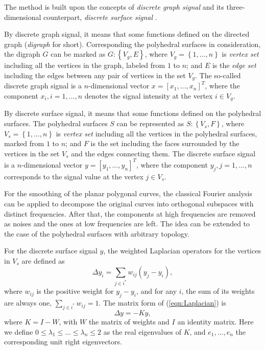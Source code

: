 The method is built upon the concepts of \emph{discrete graph signal} and its three-dimensional counterpart, \emph{discrete surface signal} \cite{Taubin1995SIG}.

By discrete graph signal, it means that some functions defined on the directed graph (\emph{digraph} for short).
Corresponding the polyhedral surfaces in consideration, the digraph $G$ can be marked as $G: \left\{ V_g, E\right\}$, where $V_g = \left\{ 1, \ldots, n \right\}$ is \emph{vertex set} including all the vertices in the graph, labeled from $1$ to $n$; and $E$ is the \emph{edge set} including the edges between any pair of vertices in the set $V_g$. %
The so-called discrete graph signal is a $n$-dimensional vector $x = \left[ x_1, \ldots, x_n \right]^T$, where the component $x_i, i = 1, \ldots, n$ denotes the signal intensity at the vertex $i \in V_g$. %

By discrete surface signal, it means that some functions defined on the polyhedral surfaces.
The polyhedral surfaces $S$ can be represented as $S: \left\{ V_s, F\right\}$, where $V_s = \left\{ 1, \ldots, n \right\}$ is \emph{vertex set} including all the vertices in the polyhedral surfaces, marked from $1$ to $n$; and $F$ is the set including the faces surrounded by the vertices in the set $V_s$ and the edges connecting them. %
The discrete surface signal is a $n$-dimensional vector $y = \left[ y_1, \ldots, y_n \right]^T$, where the component $y_j, j = 1, \ldots, n$ corresponds to the signal value at the vertex $j \in V_s$. %

For the smoothing of the planar polygonal curves, the classical Fourier analysis can be applied to decompose the original curves into orthogonal subspaces with distinct frequencies. %
After that, the components at high frequencies are removed as noises and the ones at low frequencies are left.
The idea can be extended to the case of the polyhedral surfaces with arbitrary topology.

For the discrete surface signal $y$, the weighted Laplacian operators for the vertices in $V_s$ are defined as
\begin{equation}
\label{eqn:Laplacian}
\Delta y_i = \sum_{j \in i^{\ast}} w_{ij} \left( y_j - y_i \right),
\end{equation}
where $w_{ij}$ is the positive weight for $y_j - y_i$, and for any $i$, the sum of its weights are always one, $\sum_{j \in i^{\ast}} w_{ij} = 1$.
The matrix form of (\ref{eqn:Laplacian}) is
\begin{equation}
\label{eqn:LaplacianMatrix}
\Delta y = - K y,
\end{equation}
where $K = I - W$, with $W$ the matrix of weights and $I$ an identity matrix.
Here we define $0 \leq \lambda_1 \leq \ldots \leq \lambda_n \leq 2$ as the real eigenvalues of $K$, and $e_1, \ldots, e_n$ the corresponding unit right eigenvectors.

